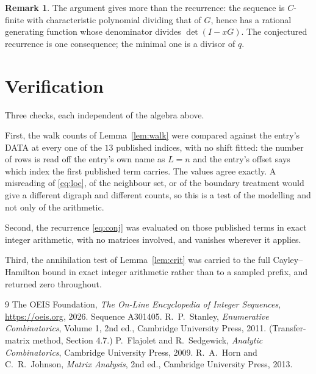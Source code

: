 \documentclass[11pt,a4paper]{article}
\theoremstyle{plain}
\theoremstyle{definition}
\newtheorem{remark}[theorem]{Remark}
\begin{document}
\begin{remark}
The argument gives more than the recurrence: the sequence is $C$-finite with characteristic
polynomial dividing that of $G$, hence has a rational generating function whose denominator
divides $\det(I-xG)$. The conjectured recurrence is one consequence; the minimal one is a
divisor of $q$.
\end{remark}

\section{Verification}

Three checks, each independent of the algebra above.

First, the walk counts of Lemma~\ref{lem:walk} were compared against the entry's DATA at
every one of the $13$ published indices, with no shift fitted: the number of rows is
read off the entry's own name as $L=n$ and the entry's offset says which index the first
published term carries. The values agree exactly. A misreading of \eqref{eq:loc}, of the
neighbour set, or of the boundary treatment would give a different digraph and different
counts, so this is a test of the modelling and not only of the arithmetic.

Second, the recurrence \eqref{eq:conj} was evaluated on those published terms in exact
integer arithmetic, with no matrices involved, and vanishes wherever it applies.

Third, the annihilation test of Lemma~\ref{lem:crit} was carried to the full
Cayley--Hamilton bound in exact integer arithmetic rather than to a sampled prefix, and
returned zero throughout.

\begin{thebibliography}{9}
 The OEIS Foundation, \emph{The On-Line Encyclopedia of Integer
Sequences}, \url{https://oeis.org}, 2026. Sequence A301405.
 R.~P.~Stanley, \emph{Enumerative Combinatorics}, Volume 1, 2nd ed.,
Cambridge University Press, 2011. (Transfer-matrix method, Section 4.7.)
 P.~Flajolet and R.~Sedgewick, \emph{Analytic Combinatorics}, Cambridge
University Press, 2009.
 R.~A.~Horn and C.~R.~Johnson, \emph{Matrix Analysis}, 2nd ed., Cambridge
University Press, 2013.
\end{thebibliography}
\end{document}
